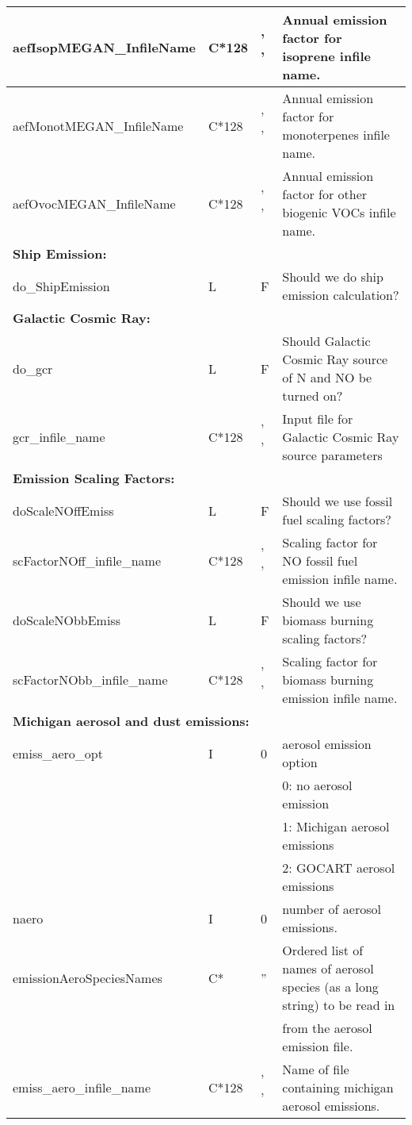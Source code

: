 {\begin{landscape}
\begin{center}
\begin{longtable}{|l|l|l|l|}
aefIsopMEGAN\_InfileName & C*128 &' ' & Annual emission factor for isoprene infile name. \\ \hline
aefMonotMEGAN\_InfileName & C*128 &' ' & Annual emission factor for monoterpenes infile name. \\ \hline
aefOvocMEGAN\_InfileName & C*128 &' ' & Annual emission factor for other biogenic VOCs infile name. \\ \hline
\multicolumn{4}{|l|}{\bf Ship Emission:} \\ \hline
do\_ShipEmission    & L & F & Should we do ship emission calculation?  \\ \hline
\multicolumn{4}{|l|}{\bf Galactic Cosmic Ray:} \\ \hline
do\_gcr    & L & F & Should Galactic Cosmic Ray source of N and NO be turned on?  \\ \hline
gcr\_infile\_name  & C*128 & ' ' & Input file for Galactic Cosmic Ray source parameters  \\ \hline
\multicolumn{4}{|l|}{\bf Emission Scaling Factors:} \\ \hline
doScaleNOffEmiss & L & F & Should we use fossil fuel scaling factors? \\ \hline
scFactorNOff\_infile\_name & C*128 & ' ' & Scaling factor for NO fossil fuel emission infile name. \\ \hline
doScaleNObbEmiss & L & F & Should we use biomass burning scaling factors? \\ \hline
scFactorNObb\_infile\_name & C*128 & ' ' & Scaling factor for biomass burning emission infile name. \\ \hline
\multicolumn{4}{|l|}{\bf Michigan aerosol and dust emissions:} \\ \hline
emiss\_aero\_opt         & I & 0 & aerosol emission option \\
                         &   &   & 0: no aerosol emission    \\
                         &   &   & 1: Michigan aerosol emissions  \\
                         &   &   & 2: GOCART aerosol emissions \\ \hline
naero                  & I & 0 & number of aerosol emissions.  \\ \hline
emissionAeroSpeciesNames & C* & '' & Ordered list of names of aerosol species (as a long string) to be read in \\
                              &      &    & from the aerosol emission file.  \\
emiss\_aero\_infile\_name & C*128 & ' ' & Name of file containing michigan aerosol emissions.  \\ \hline

\end{longtable}
\end{center}
\end{landscape}}
